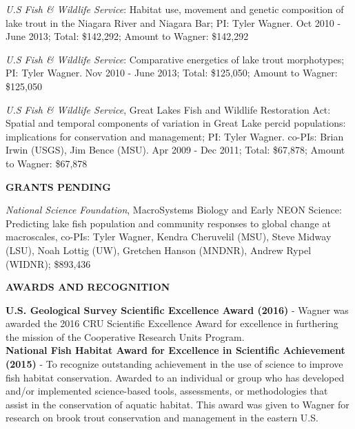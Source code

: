 \documentclass[10pt]{article}
\begin{document}
\begin{flushleft}
\begin{etaremune}
\item {\sl U.S Fish \& Wildlife Service}: Habitat use, movement and genetic composition of lake trout in the Niagara River and Niagara Bar; PI: Tyler Wagner. Oct 2010 - June 2013; Total: \$142,292;  Amount to Wagner: \$142,292

\item  {\sl U.S Fish \& Wildlife Service}: Comparative energetics of lake trout morphotypes; PI: Tyler Wagner. Nov 2010 - June 2013; Total: \$125,050; Amount to Wagner:  \$125,050

\item  {\sl U.S Fish \& Wildlife Service}, Great Lakes Fish and Wildlife Restoration Act: Spatial and temporal components of variation in Great Lake percid populations: implications for conservation and management; PI: Tyler Wagner. co-PIs: Brian Irwin (USGS), Jim Bence (MSU). Apr 2009 - Dec 2011; Total: \$67,878; Amount to Wagner: \$67,878
\end{etaremune}

\centerline {\bf{GRANTS PENDING}}
\vspace{5pt}
\begin{etaremune}
\item {\sl  National Science Foundation}, MacroSystems Biology and Early NEON Science: Predicting lake fish population and community responses to global change at macroscales, co-PIs: Tyler Wagner, Kendra Cheruvelil (MSU), Steve Midway (LSU), Noah Lottig (UW), Gretchen Hanson (MNDNR), Andrew Rypel (WIDNR); \$893,436
\end{etaremune}

\centerline {\bf{AWARDS AND RECOGNITION}}
\vspace{5pt}
{\bf U.S. Geological Survey Scientific Excellence Award (2016)} - Wagner was awarded the 2016 CRU Scientific Excellence Award for excellence in furthering the mission of the Cooperative Research Units Program.\\
\vspace{6pt}
{\bf National Fish Habitat Award for Excellence in Scientific Achievement  (2015)} - To recognize outstanding achievement in the use of science to improve fish habitat conservation. Awarded to an individual or group who has developed and/or implemented science-based tools, assessments, or methodologies that assist in the conservation of aquatic habitat. This award was given to Wagner for research on brook trout conservation and management in the eastern U.S.\\


\end{flushleft}
\end{document}
